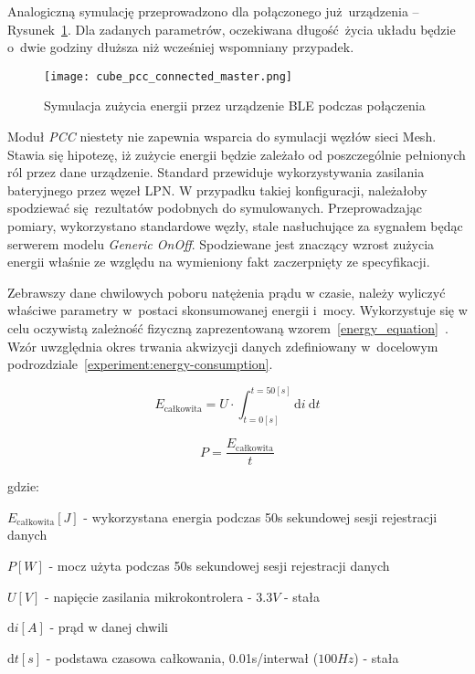 Analogiczną symulację przeprowadzono dla połączonego już urządzenia -- Rysunek~\ref{rys:cube_pcc_connected_master}.
Dla zadanych parametrów, oczekiwana długość życia układu będzie o~dwie godziny dłuższa niż wcześniej wspomniany
przypadek.

\begin{figure}[!ht]
	\centering \texttt{[image: cube\_pcc\_connected\_master.png]} 
	\caption{Symulacja zużycia energii przez urządzenie \gls{BLE} podczas połączenia}
	\label{rys:cube_pcc_connected_master}
\end{figure}

Moduł \textit{PCC} niestety nie zapewnia wsparcia do symulacji węzłów sieci Mesh. Stawia się hipotezę,
iż zużycie energii będzie zależało od poszczególnie pełnionych ról przez dane urządzenie. Standard
przewiduje wykorzystywania zasilania bateryjnego przez węzeł \gls{LPN}. W przypadku takiej konfiguracji,
należałoby spodziewać się rezultatów podobnych do symulowanych. Przeprowadzając pomiary, wykorzystano
standardowe węzły, stale nasłuchujące za sygnałem będąc serwerem modelu \textit{Generic OnOff}. Spodziewane
jest znaczący wzrost zużycia energii właśnie ze względu na wymieniony fakt zaczerpnięty ze specyfikacji.

Zebrawszy dane chwilowych poboru natężenia prądu w czasie, należy wyliczyć właściwe parametry w~postaci
skonsumowanej energii i~mocy. Wykorzystuje się w celu oczywistą zależność fizyczną zaprezentowaną
wzorem~\ref{energy_equation}~\cite{skoro_marta_fizyka_1973}. Wzór uwzględnia okres trwania akwizycji danych
zdefiniowany w~docelowym podrozdziale~\ref{experiment:energy-consumption}.

\begin{equation} \label{energy_equation}
E_{\text{całkowita}} = U \cdot \int_{t=0[s]}^{t=50[s]} \mathrm{d}i \: \mathrm{d} t
\end{equation}

\begin{equation} \label{power_equation}
P = \frac{E_{\text{całkowita}}}{t}
\end{equation}

gdzie:

\begin{description}
\item $E_{\text{całkowita}} [J]$ - wykorzystana energia podczas 50s sekundowej sesji rejestracji danych
\item $P [W]$ - mocz użyta podczas 50s sekundowej sesji rejestracji danych
\item $U [V]$ - napięcie zasilania mikrokontrolera - $3.3V$ - stała
\item $\mathrm{d}i [A]$ - prąd w danej chwili
\item $\mathrm{d}t [s]$ - podstawa czasowa całkowania, 0.01s/interwał ($100Hz$) - stała 
\end{description}

